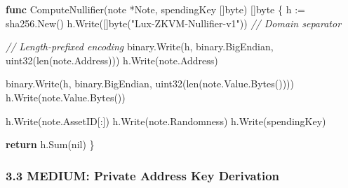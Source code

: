 \documentclass[
]{article}
\newenvironment{Shaded}{}{}
\newcommand{\BuiltInTok}[1]{\textcolor[rgb]{0.00,0.50,0.00}{#1}}
\newcommand{\CommentTok}[1]{\textcolor[rgb]{0.38,0.63,0.69}{\textit{#1}}}
\newcommand{\ControlFlowTok}[1]{\textcolor[rgb]{0.00,0.44,0.13}{\textbf{#1}}}
\newcommand{\DataTypeTok}[1]{\textcolor[rgb]{0.56,0.13,0.00}{#1}}
\newcommand{\KeywordTok}[1]{\textcolor[rgb]{0.00,0.44,0.13}{\textbf{#1}}}
\newcommand{\NormalTok}[1]{#1}
\newcommand{\OperatorTok}[1]{\textcolor[rgb]{0.40,0.40,0.40}{#1}}
\newcommand{\OtherTok}[1]{\textcolor[rgb]{0.00,0.44,0.13}{#1}}
\newcommand{\StringTok}[1]{\textcolor[rgb]{0.25,0.44,0.63}{#1}}
\begin{document}
\begin{Shaded}
\begin{Highlighting}[]
\KeywordTok{func}\NormalTok{ ComputeNullifier}\OperatorTok{(}\NormalTok{note }\OperatorTok{*}\NormalTok{Note}\OperatorTok{,}\NormalTok{ spendingKey }\OperatorTok{[]}\DataTypeTok{byte}\OperatorTok{)} \OperatorTok{[]}\DataTypeTok{byte} \OperatorTok{\{}
\NormalTok{    h }\OperatorTok{:=}\NormalTok{ sha256}\OperatorTok{.}\NormalTok{New}\OperatorTok{()}
\NormalTok{    h}\OperatorTok{.}\NormalTok{Write}\OperatorTok{([]}\DataTypeTok{byte}\OperatorTok{(}\StringTok{"Lux{-}ZKVM{-}Nullifier{-}v1"}\OperatorTok{))}  \CommentTok{// Domain separator}
    
    \CommentTok{// Length{-}prefixed encoding}
\NormalTok{    binary}\OperatorTok{.}\NormalTok{Write}\OperatorTok{(}\NormalTok{h}\OperatorTok{,}\NormalTok{ binary}\OperatorTok{.}\NormalTok{BigEndian}\OperatorTok{,} \DataTypeTok{uint32}\OperatorTok{(}\BuiltInTok{len}\OperatorTok{(}\NormalTok{note}\OperatorTok{.}\NormalTok{Address}\OperatorTok{)))}
\NormalTok{    h}\OperatorTok{.}\NormalTok{Write}\OperatorTok{(}\NormalTok{note}\OperatorTok{.}\NormalTok{Address}\OperatorTok{)}
    
\NormalTok{    binary}\OperatorTok{.}\NormalTok{Write}\OperatorTok{(}\NormalTok{h}\OperatorTok{,}\NormalTok{ binary}\OperatorTok{.}\NormalTok{BigEndian}\OperatorTok{,} \DataTypeTok{uint32}\OperatorTok{(}\BuiltInTok{len}\OperatorTok{(}\NormalTok{note}\OperatorTok{.}\NormalTok{Value}\OperatorTok{.}\NormalTok{Bytes}\OperatorTok{())))}
\NormalTok{    h}\OperatorTok{.}\NormalTok{Write}\OperatorTok{(}\NormalTok{note}\OperatorTok{.}\NormalTok{Value}\OperatorTok{.}\NormalTok{Bytes}\OperatorTok{())}
    
\NormalTok{    h}\OperatorTok{.}\NormalTok{Write}\OperatorTok{(}\NormalTok{note}\OperatorTok{.}\NormalTok{AssetID}\OperatorTok{[:])}
\NormalTok{    h}\OperatorTok{.}\NormalTok{Write}\OperatorTok{(}\NormalTok{note}\OperatorTok{.}\NormalTok{Randomness}\OperatorTok{)}
\NormalTok{    h}\OperatorTok{.}\NormalTok{Write}\OperatorTok{(}\NormalTok{spendingKey}\OperatorTok{)}
    
    \ControlFlowTok{return}\NormalTok{ h}\OperatorTok{.}\NormalTok{Sum}\OperatorTok{(}\OtherTok{nil}\OperatorTok{)}
\OperatorTok{\}}
\end{Highlighting}
\end{Shaded}

\subsubsection{3.3 MEDIUM: Private Address Key
Derivation}\label{33-medium-private-address-key-derivation}
\end{document}
